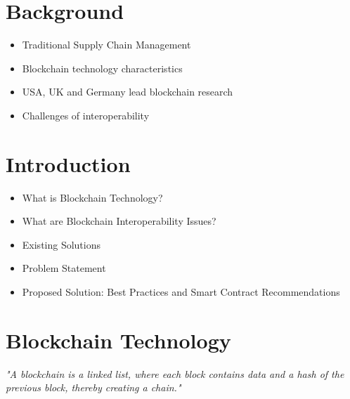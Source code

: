 \documentclass{beamer}
\begin{document}
\section{Background}
\begin{frame}

\vspace{0.5cm}
\begin{itemize}
    \item Traditional Supply Chain Management
    \item Blockchain technology characteristics
    \item USA, UK and Germany lead blockchain research
    \item Challenges of interoperability
\end{itemize}
\end{frame}

\section{Introduction}
\begin{frame}

\vspace{0.5cm}
\begin{itemize}
    \item What is Blockchain Technology?
    \item What are Blockchain Interoperability Issues?
    \item Existing Solutions
    \item Problem Statement
    \item Proposed Solution: Best Practices and Smart Contract Recommendations
\end{itemize}
\end{frame}

\section{Blockchain Technology}
\begin{frame}

\vspace{0.5cm}
\textit{"A blockchain is a linked list, where each block contains data and a hash of the previous block, thereby creating a chain."}
\end{frame}
\end{document}
